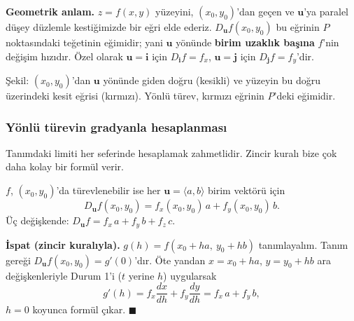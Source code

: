 \textbf{Geometrik anlam.} $z=f(x,y)$ yüzeyini, $(x_0,y_0)$'dan geçen ve $\mathbf u$'ya paralel düşey düzlemle
kestiğimizde bir eğri elde ederiz. $D_{\mathbf u}f(x_0,y_0)$ bu eğrinin $P$ noktasındaki teğetinin eğimidir; yani
$\mathbf u$ yönünde \textbf{birim uzaklık başına} $f$'nin değişim hızıdır. Özel olarak $\mathbf u=\mathbf i$ için
$D_{\mathbf i}f=f_x$, $\mathbf u=\mathbf j$ için $D_{\mathbf j}f=f_y$'dir.

\begin{center}
\end{center}
{\small Şekil: $(x_0,y_0)$'dan $\mathbf u$ yönünde giden doğru (kesikli) ve yüzeyin bu doğru üzerindeki kesit eğrisi
(kırmızı). Yönlü türev, kırmızı eğrinin $P$'deki eğimidir.}

\subsubsection{Yönlü türevin gradyanla hesaplanması}

Tanımdaki limiti her seferinde hesaplamak zahmetlidir. Zincir kuralı bize çok daha kolay bir formül verir.

\begin{teorem}
$f$, $(x_0,y_0)$'da türevlenebilir ise her $\mathbf u=\langle a,b\rangle$ birim vektörü için
\[
D_{\mathbf u}f(x_0,y_0)=f_x(x_0,y_0)\,a+f_y(x_0,y_0)\,b .
\]
Üç değişkende: $D_{\mathbf u}f=f_x\,a+f_y\,b+f_z\,c$.
\end{teorem}
\textbf{İspat (zincir kuralıyla).} $g(h)=f(x_0+ha,\ y_0+hb)$ tanımlayalım. Tanım gereği $D_{\mathbf u}f(x_0,y_0)=g'(0)$'dır.
Öte yandan $x=x_0+ha$, $y=y_0+hb$ ara değişkenleriyle Durum 1'i ($t$ yerine $h$) uygularsak
\[
g'(h)=f_x\frac{dx}{dh}+f_y\frac{dy}{dh}=f_x\,a+f_y\,b,
\]
$h=0$ koyunca formül çıkar. $\blacksquare$

